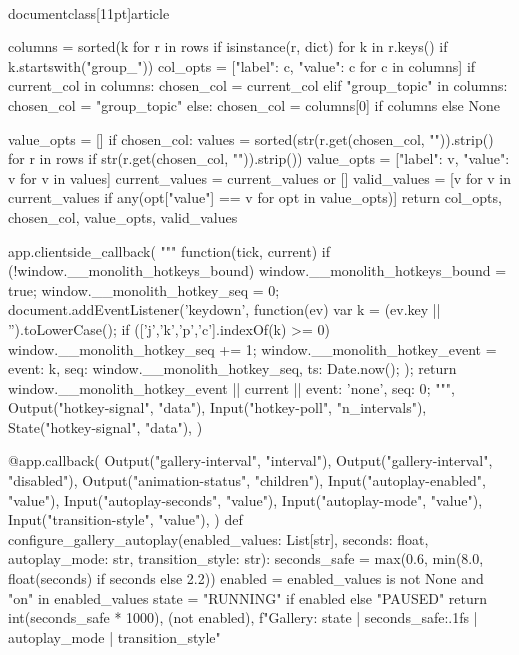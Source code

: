 \\documentclass[11pt]{article}
\begin{document}
\begin{CodeBlock}
{{{{{{{{    columns = sorted({k for r in rows if isinstance(r, dict) for k in r.keys() if k.startswith("group_")})
    col_opts = [{"label": c, "value": c} for c in columns]
    if current_col in columns:
        chosen_col = current_col
    elif "group_topic" in columns:
        chosen_col = "group_topic"
    else:
        chosen_col = columns[0] if columns else None

    value_opts = []
    if chosen_col:
        values = sorted({str(r.get(chosen_col, "")).strip() for r in rows if str(r.get(chosen_col, "")).strip()})
        value_opts = [{"label": v, "value": v} for v in values]
    current_values = current_values or []
    valid_values = [v for v in current_values if any(opt["value"] == v for opt in value_opts)]
    return col_opts, chosen_col, value_opts, valid_values


app.clientside_callback(
    """
    function(tick, current) {
        if (!window.__monolith_hotkeys_bound) {
            window.__monolith_hotkeys_bound = true;
            window.__monolith_hotkey_seq = 0;
            document.addEventListener('keydown', function(ev) {
                var k = (ev.key || '').toLowerCase();
                if (['j','k','p','c'].indexOf(k) >= 0) {
                    window.__monolith_hotkey_seq += 1;
                    window.__monolith_hotkey_event = {event: k, seq: window.__monolith_hotkey_seq, ts: Date.now()};
                }
            });
        }
        return window.__monolith_hotkey_event || current || {event: 'none', seq: 0};
    }
    """,
    Output("hotkey-signal", "data"),
    Input("hotkey-poll", "n_intervals"),
    State("hotkey-signal", "data"),
)


@app.callback(
    Output("gallery-interval", "interval"),
    Output("gallery-interval", "disabled"),
    Output("animation-status", "children"),
    Input("autoplay-enabled", "value"),
    Input("autoplay-seconds", "value"),
    Input("autoplay-mode", "value"),
    Input("transition-style", "value"),
)
def configure_gallery_autoplay(enabled_values: List[str], seconds: float, autoplay_mode: str, transition_style: str):
    seconds_safe = max(0.6, min(8.0, float(seconds) if seconds else 2.2))
    enabled = enabled_values is not None and "on" in enabled_values
    state = "RUNNING" if enabled else "PAUSED"
    return int(seconds_safe * 1000), (not enabled), f"Gallery: {state} | {seconds_safe:.1f}s | {autoplay_mode} | {transition_style}"


}}}}}}}}
\end{CodeBlock}
\end{document}
